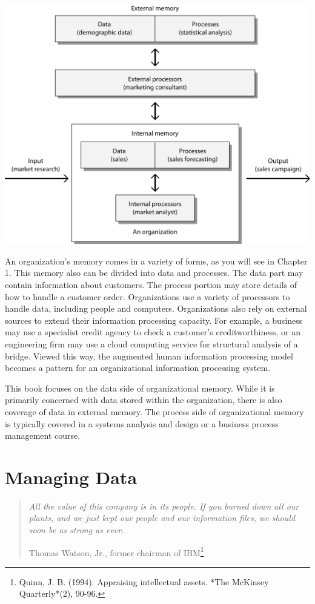 \documentclass[
]{article}
\begin{document}
\includegraphics{Figures/Section 1/org info processing.png}

An organization's memory comes in a variety of forms, as you will see in
Chapter 1. This memory also can be divided into data and processes. The
data part may contain information about customers. The process portion
may store details of how to handle a customer order. Organizations use a
variety of processors to handle data, including people and computers.
Organizations also rely on external sources to extend their information
processing capacity. For example, a business may use a specialist credit
agency to check a customer's creditworthiness, or an engineering firm
may use a cloud computing service for structural analysis of a bridge.
Viewed this way, the augmented human information processing model
becomes a pattern for an organizational information processing system.

This book focuses on the data side of organizational memory. While it is
primarily concerned with data stored within the organization, there is
also coverage of data in external memory. The process side of
organizational memory is typically covered in a systems analysis and
design or a business process management course.

\newpage

\hypertarget{managing-data}{%
\section{Managing Data}\label{managing-data}}

\begin{quote}
\emph{All the value of this company is in its people. If you burned down
all our plants, and we just kept our people and our information files,
we should soon be as strong as ever.}

Thomas Watson, Jr., former chairman of IBM\footnote{Quinn, J. B. (1994). Appraising intellectual assets. *The
  McKinsey Quarterly*(2), 90-96.}
\end{quote}
\end{document}
